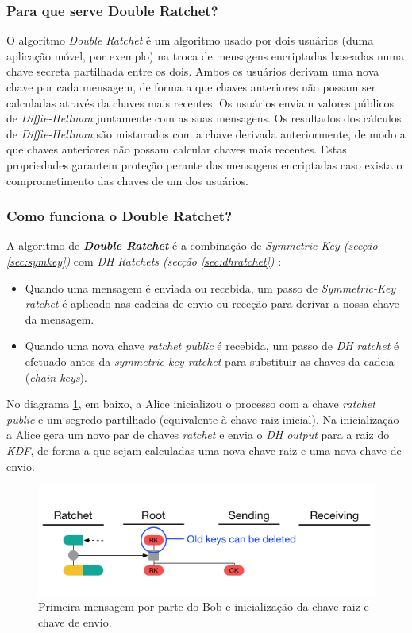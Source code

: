 \subsubsection{Para que serve Double Ratchet?}
O algoritmo \emph{Double Ratchet} é um algoritmo usado por dois usuários (duma aplicação móvel, por exemplo) na troca de mensagens encriptadas baseadas numa chave secreta partilhada entre os dois. Ambos os usuários derivam uma nova chave por cada mensagem, de forma a que chaves anteriores não possam ser calculadas através da chaves mais recentes. Os usuários enviam valores públicos de \emph{Diffie-Hellman} juntamente com as suas mensagens. Os resultados dos cálculos de \emph{Diffie-Hellman} são misturados com a chave derivada anteriormente, de modo a que chaves anteriores não possam calcular chaves mais recentes. Estas propriedades garantem proteção perante das mensagens encriptadas caso exista o comprometimento das chaves de um dos usuários.

\subsubsection{Como funciona o Double Ratchet?}
A algoritmo de \textit{\textbf{Double Ratchet}} é a combinação de \textit{Symmetric-Key (secção \ref{sec:symkey})} com \textit{DH Ratchets (secção \ref{sec:dhratchet})} :

\begin{itemize}
    \item Quando uma mensagem é enviada ou recebida, um passo de \textit{Symmetric-Key ratchet} é aplicado nas cadeias de envio ou receção para derivar a nossa chave da mensagem.
    \item Quando uma nova chave \textit{ratchet public} é recebida, um passo de \textit{DH ratchet} é efetuado antes da \textit{symmetric-key ratchet} para substituir as chaves da cadeia (\textit{chain keys}).
\end{itemize}

No diagrama \ref{diagram:DR1}, em baixo, a Alice inicializou o processo com a chave \textit{ratchet public} e um segredo partilhado (equivalente à chave raiz inicial). Na inicialização a Alice gera um novo par de chaves \textit{ratchet} e envia o \textit{DH output} para a raiz do \textit{KDF}, de forma a que sejam calculadas uma nova chave raiz e uma nova chave de envio.

\begin{figure}[H]
    \begin{center}
        \includegraphics[width=12cm]{img/DR1.png}
        \caption{Primeira mensagem por parte do Bob e inicialização da chave raiz e chave de envio.}
        \label{diagram:DR1}
    \end{center}
\end{figure}

